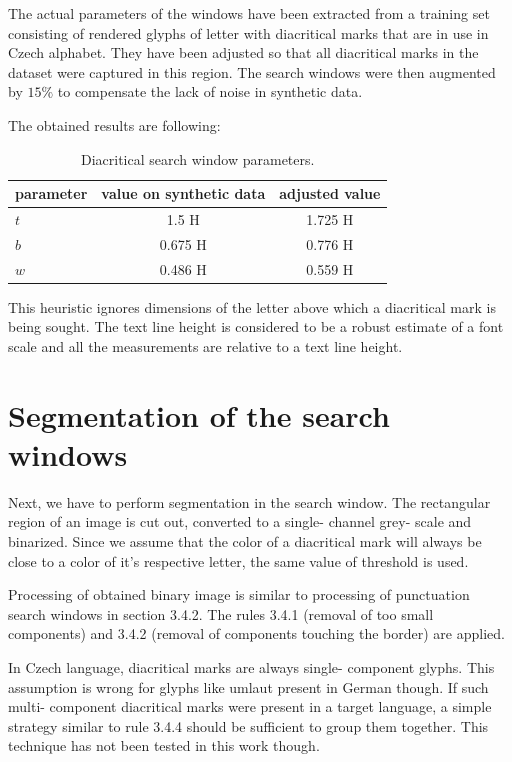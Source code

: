 \documentclass[12pt,a4paper]{report}
\begin{document}
The actual parameters of the windows have been extracted from a training set consisting of rendered glyphs of letter with diacritical marks that are in use in Czech alphabet. They have been adjusted so that all diacritical marks in the dataset were captured in this region. The search windows were then augmented by $15\%$ to compensate the lack of noise in synthetic data.

The obtained results are following:

\begin{table}[htbp]
    \centering
    \begin{tabular}{lcc}
        \toprule
        parameter & value on synthetic data & adjusted value \\
        \midrule
        $t$ & 1.5 H & 1.725 H \\
        $b$ & 0.675 H & 0.776 H \\
        $w$ & 0.486 H & 0.559 H \\
        \bottomrule
    \end{tabular}
    \caption{Diacritical search window parameters.}
    \label{tab:diacritic-params}
\end{table}

This heuristic ignores dimensions of the letter above which a diacritical mark is being sought. The text line height is considered to be a robust estimate of a font scale and all the measurements are relative to a text line height.

\section{Segmentation of the search windows}
Next, we have to perform segmentation in the search window. The rectangular region of an image is cut out, converted to a single- channel grey- scale and binarized. Since we assume that the color of a diacritical mark will always be close to a color of it's respective letter, the same value of threshold is used.

Processing of obtained binary image is similar to processing of punctuation search windows in section 3.4.2. The rules 3.4.1 (removal of too small components) and 3.4.2 (removal of components touching the border) are applied.

In Czech language, diacritical marks are always single- component glyphs. This assumption is wrong for glyphs like umlaut present in German though. If such multi- component diacritical marks were present in a target language, a simple strategy similar to rule 3.4.4 should be sufficient to group them together. This technique has not been tested in this work though.
\end{document}
